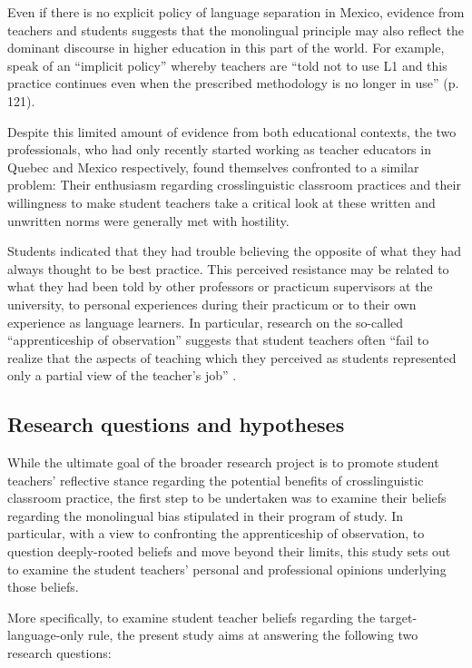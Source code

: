 \documentclass[output=paper]{../langscibook}
\begin{document}
Even if there is no explicit policy of language separation in Mexico, evidence from teachers and students suggests that the monolingual principle may also reflect the dominant discourse in higher education in this part of the world. For example,  \citet{MoraPabloEtAl2011} speak of an “implicit policy” whereby teachers are “told not to use L1 and this practice continues even when the prescribed methodology is no longer in use” (p. 121).

Despite this limited amount of evidence from both educational contexts, the two professionals, who had only recently started working as teacher educators in Quebec and Mexico respectively, found themselves confronted to a similar problem: Their enthusiasm regarding crosslinguistic classroom practices and their willingness to make student teachers take a critical look at these written and unwritten norms were generally met with hostility. 

Students indicated that they had trouble believing the opposite of what they had always thought to be best practice. This perceived resistance may be related to what they had been told by other professors or practicum supervisors at the university, to personal experiences during their practicum or to their own experience as language learners. In particular, research on the so-called “apprenticeship of observation” \citep{Lortie1975} suggests that student teachers often “fail to realize that the aspects of teaching which they perceived as students represented only a partial view of the teacher’s job” \citep[274]{Borg2004}.

\subsection{Research questions and hypotheses}
While the ultimate goal of the broader research project is to promote student teachers’ reflective stance regarding the potential benefits of crosslinguistic classroom practice, the first step to be undertaken was to examine their beliefs regarding the monolingual bias stipulated in their program of study. In particular, with a view to confronting the apprenticeship of observation, to question deeply-rooted beliefs and move beyond their limits, this study sets out to examine the student teachers’ personal and professional opinions underlying those beliefs. 

More specifically, to examine student teacher beliefs regarding the target-lan\-guage-only rule, the present study aims at answering the following two research questions: 
\end{document}
